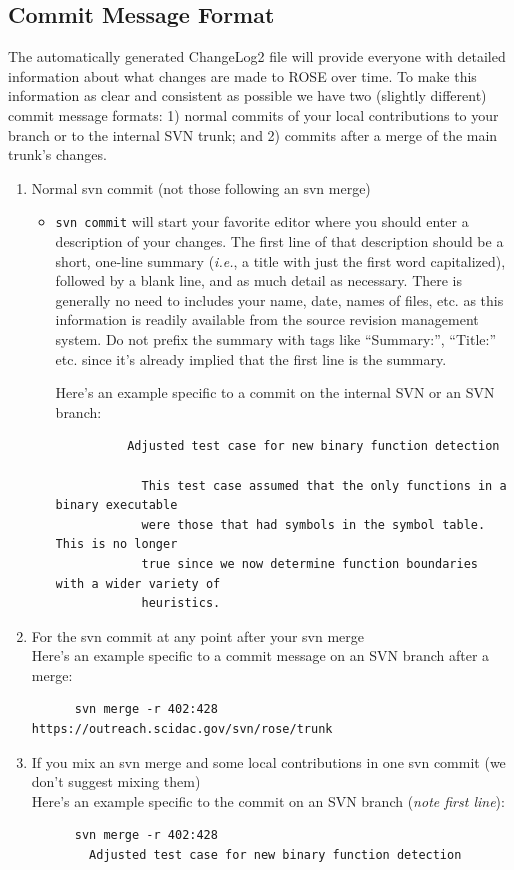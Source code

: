   \subsection{Commit Message Format}
  \label{CommitMessageFormat}
  The automatically generated ChangeLog2 file will provide everyone with
    detailed information about what changes are made to ROSE over time. To
    make this information as clear and consistent as possible we have two
    (slightly different) commit message formats:
    1) normal commits of your local contributions to your branch or to 
    the internal SVN trunk; and
    2) commits after a merge of the main trunk's changes.
    \begin{enumerate}
  \item Normal svn commit (not those following an svn merge)
    \begin{itemize}
  \item {\tt svn commit} will start your favorite editor where you should enter a
    description of your changes. The first line of that description should be
    a short, one-line summary ({\it i.e.}, a title with just the first word capitalized),
      followed by a blank line, and as much detail as necessary. There is generally
        no need to includes your name, date, names of files, etc. as this information
        is readily available from the source revision management system. Do not prefix
        the summary with tags like ``Summary:'', ``Title:'' etc. since it's already
        implied that the first line is the summary.

        Here's an example specific to a commit on the internal SVN or an SVN branch:
        {\indent
          \begin{verbatim}
          Adjusted test case for new binary function detection

            This test case assumed that the only functions in a binary executable
            were those that had symbols in the symbol table.  This is no longer
            true since we now determine function boundaries with a wider variety of
            heuristics.
            \end{verbatim} 
        }
  \end{itemize}
  \item For the svn commit at any point after your svn merge \\
    Here's an example specific to a commit message on an SVN branch after a merge:
    {\indent
      \begin{verbatim}
      svn merge -r 402:428 https://outreach.scidac.gov/svn/rose/trunk
        \end{verbatim} 
    }
  \item If you mix an svn merge and some local contributions in one svn
    commit (we don't suggest mixing them)\\
    Here's an example specific to the commit on an SVN branch ({\em note first line}):
    {\indent
      \begin{verbatim}
      svn merge -r 402:428
        Adjusted test case for new binary function detection


\end{verbatim}}
\end{enumerate}
